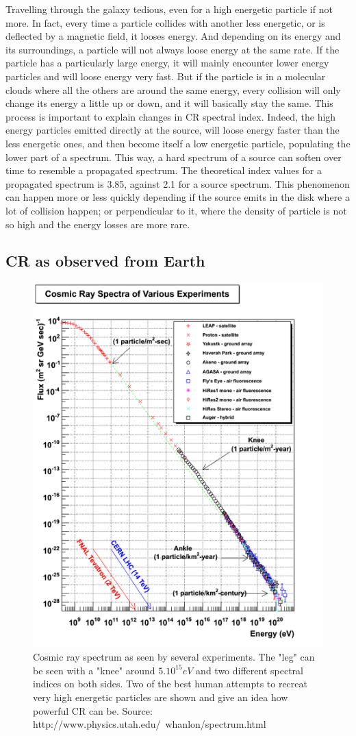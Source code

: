 Travelling through the galaxy tedious, even for a high energetic particle if not more. In fact, every time a particle collides with another less energetic, or is deflected by a magnetic field, it looses energy. And depending on its energy and its surroundings, a particle will not always loose energy at the same rate.
If the particle has a particularly large energy, it will mainly encounter lower energy particles and will loose energy very fast. But if the particle is in a molecular clouds where all the others are around the same energy, every collision will only change its energy a little up or down, and it will basically stay the same.
This process is important to explain changes in CR spectral index. Indeed, the high energy particles emitted directly at the source, will loose energy faster than the less energetic ones, and then become itself a low energetic particle, populating the lower part of a spectrum. This way, a hard spectrum of a source can soften over time to resemble a propagated spectrum. The theoretical index values for a propagated spectrum is 3.85, against 2.1 for a source spectrum. 
This phenomenon can happen more or less quickly depending if the source emits in the disk where a lot of collision happen; or perpendicular to it, where the density of particle is not so high and the energy losses are more rare.



\subsection{CR as observed from Earth}

\begin{figure}[h]
 \centering
 \includegraphics[width=.5\linewidth]{pic/theory/CR_spectrum.png}
 \caption{Cosmic ray spectrum as seen by several experiments. The "leg" can be seen with a "knee" around $5.10^{15} eV$ and two different spectral indices on both sides. Two of the best human attempts to recreat very high energetic particles are shown and give an idea how powerful CR can be.
 Source: http://www.physics.utah.edu/~whanlon/spectrum.html}
 \label{fig:CR_spectrum}
\end{figure}

